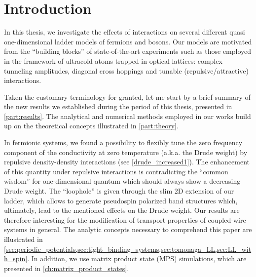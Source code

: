 %
\chapter*{Introduction}
%
In this thesis, we investigate the effects of interactions on several different quasi one-dimensional ladder models of fermions and bosons.
Our models are motivated from the ``building blocks'' of state-of-the-art experiments such as those employed in the framework of ultracold atoms trapped in optical lattices: complex tunneling amplitudes, diagonal cross hoppings and tunable (repulsive/attractive) interactions.

Taken the customary terminology for granted, let me start by a brief summary of the new results we established during the period of this thesis, presented in \cref{part:results}.
The analytical and numerical methods employed in our works build up on the theoretical concepts illustrated in \cref{part:theory}.

In fermionic systems, we found a possibility to flexibly tune the zero frequency component of the conductivity at zero temperature (a.k.a. the Drude weight) by repulsive density-density interactions (see \cref{drude_increased1}).
The enhancement of this quantity under repulsive interactions is contradicting the ``common wisdom'' for one-dimensional quantum which should always show a decreasing Drude weight.
The ``loophole'' is given through the slim 2D extension of our ladder, which allows to generate pseudospin polarized band structures which, ultimately, lead to the mentioned effects on the Drude weight.
Our results are therefore interesting for the modification of transport properties of coupled-wire systems in general.
The analytic concepts necessary to comprehend this paper are illustrated in \cref{sec:periodic_potentials,sec:tight_binding_systems,sec:tomonaga_LL,sec:LL_with_spin}.
In addition, we use matrix product state (MPS) simulations, which are presented in \cref{ch:matrix_product_states}.


